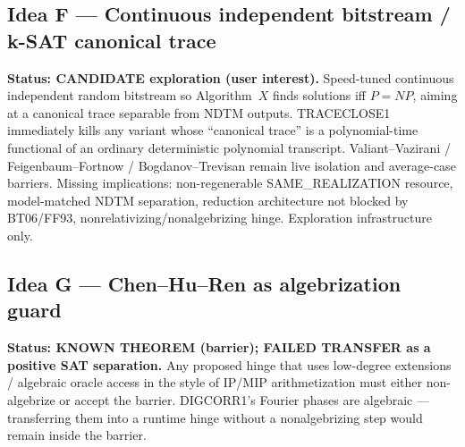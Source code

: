 \documentclass[11pt]{article}
\begin{document}
\subsection*{Idea F --- Continuous independent bitstream / k-SAT canonical trace}
\textbf{Status: CANDIDATE exploration (user interest).}
Speed-tuned continuous independent random bitstream so Algorithm~$X$ finds solutions iff
$P=NP$, aiming at a canonical trace separable from NDTM outputs. TRACECLOSE1 immediately
kills any variant whose ``canonical trace'' is a polynomial-time functional of an ordinary
deterministic polynomial transcript. Valiant--Vazirani / Feigenbaum--Fortnow /
Bogdanov--Trevisan remain live isolation and average-case barriers. Missing implications:
non-regenerable SAME\_REALIZATION resource, model-matched NDTM separation, reduction
architecture not blocked by BT06/FF93, nonrelativizing/nonalgebrizing hinge. Exploration
infrastructure only.

\subsection*{Idea G --- Chen--Hu--Ren as algebrization guard}
\textbf{Status: KNOWN THEOREM (barrier); FAILED TRANSFER as a positive SAT separation.}
Any proposed hinge that uses low-degree extensions / algebraic oracle access in the style of
IP/MIP arithmetization must either non-algebrize or accept the barrier. DIGCORR1's
Fourier phases are algebraic --- transferring them into a runtime hinge without a
nonalgebrizing step would remain inside the barrier.
\end{document}
